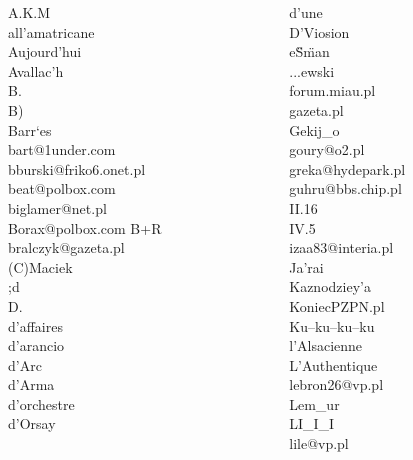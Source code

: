 \documentclass[xcolor=dvipsnames,polish]{beamer}
\begin{document}
\begin{frame}[allowframebreaks]
\begin{columns}
 \begin{column}{.2\textwidth}
 A.K.M\\
 all'amatricane\\
 Aujourd'hui\\
 Avallac'h\\
 B.\\
 B)\\
 Barr`es\\
 bart@1under.com\\
 bburski@friko6.onet.pl\\
 beat@polbox.com\\
 biglamer@net.pl\\
 Borax@polbox.com
 B+R\\
 bralczyk@gazeta.pl\\
 (C)Maciek\\
 ;d\\
 D.\\
 d'affaires\\
 d'arancio\\
 d'Arc\\
 d'Arma\\
 d'orchestre\\
 d'Orsay
 \end{column}
 \begin{column}{.2\textwidth}
 d'une\\
 D'Viosion\\
 e\"S\"man\\
 ...ewski\\
 forum.miau.pl\\
 gazeta.pl\\
 Gekij\_o\\
 goury@o2.pl\\
 greka@hydepark.pl\\
 guhru@bbs.chip.pl\\
 II.16\\
 IV.5\\
 izaa83@interia.pl\\
 Ja'rai\\
 Kaznodziey'a\\
 KoniecPZPN.pl\\
 Ku–ku–ku–ku\\
 l'Alsacienne\\
 L'Authentique\\
 lebron26@vp.pl\\
 Lem\_ur\\
 LI\_I\_I\\
 lile@vp.pl\\
\end{column}

\end{columns}
\end{frame}
\end{document}
